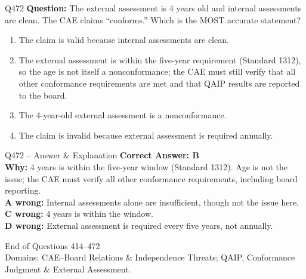 \documentclass[aspectratio=169,10pt]{beamer}
\begin{document}
	\begin{frame}[t]{Q472}
		\small
		\textbf{Question:} The external assessment is 4 years old and internal assessments are clean. The CAE claims ``conforms.'' Which is the MOST accurate statement?
		\begin{enumerate}[label=\Alph*.,itemsep=1pt,topsep=2pt]
			\item The claim is valid because internal assessments are clean.
			\item The external assessment is within the five-year requirement (Standard 1312), so the age is not itself a nonconformance; the CAE must still verify that all other conformance requirements are met and that QAIP results are reported to the board.
			\item The 4-year-old external assessment is a nonconformance.
			\item The claim is invalid because external assessment is required annually.
		\end{enumerate}
	\end{frame}
	
	\begin{frame}[t]{Q472 -- Answer \& Explanation}
		\small
		\textbf{Correct Answer: B} \\[4pt]
		\textbf{Why:} 4 years is within the five-year window (Standard 1312). Age is not the issue; the CAE must verify all other conformance requirements, including board reporting. \\[4pt]
		\textbf{A wrong:} Internal assessments alone are insufficient, though not the issue here. \\[2pt]
		\textbf{C wrong:} 4 years is within the window. \\[2pt]
		\textbf{D wrong:} External assessment is required every five years, not annually.
	\end{frame}
	
	\begin{frame}
		\centering
		\Large End of Questions 414--472\\[8pt]
		\normalsize Domains: CAE--Board Relations \& Independence Threats; QAIP, Conformance Judgment \& External Assessment.
	\end{frame}
	
\end{document}
